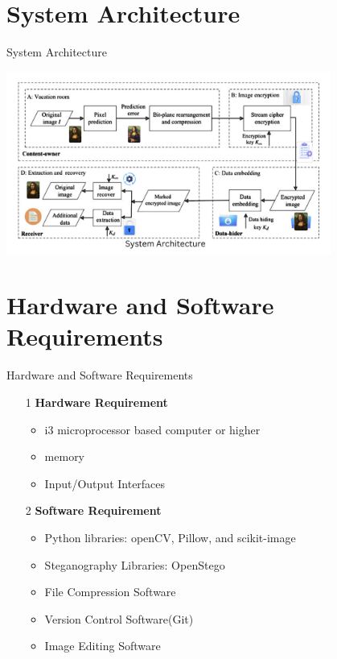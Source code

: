 \documentclass[10pt,xcolor=dvipsnames]{beamer}
\begin{document}
\section[System Architecture]{System Architecture}

\begin{frame}{System Architecture}

\includegraphics[height=6cm]{System Architecture.jpg}

\end{frame}


\section[Hardware and Software Requirements]{Hardware and Software Requirements}

\begin{frame}{Hardware and Software Requirements}
\begin{itemize}
        \item[1] \textbf{Hardware Requirement}
        \begin{itemize}
            \item i3 microprocessor based computer or higher
            \item memory
            \item Input/Output Interfaces
        \end{itemize}
        \item[2] \textbf{Software Requirement}
        \begin{itemize}
            \item Python libraries: openCV, Pillow, and scikit-image
            \item Steganography Libraries: OpenStego
            \item File Compression Software
            \item Version Control Software(Git)
            \item Image Editing Software
        \end{itemize}
\end{itemize}



\end{frame}
\end{document}
